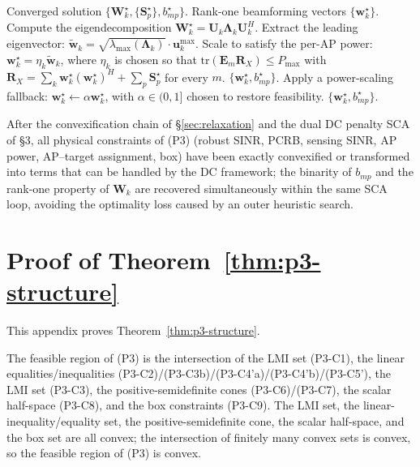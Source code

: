 \documentclass[12pt,a4paper]{article}
\newcommand{\vect}[1]{\mathbf{#1}}
\newcommand{\mat}[1]{\mathbf{#1}}
\newcommand{\tr}{\text{tr}}
\begin{document}
\begin{algorithm}[htbp]
\caption{Rank-One Beamforming Extraction (Baseline Post-Processing)}
\label{alg:rank1}
\begin{algorithmic}[1]
\Require Converged solution $\{\mat{W}_k^\star, \{\mat{S}_p^\star\}, b_{mp}^\star\}$.
\Ensure Rank-one beamforming vectors $\{\vect{w}_k^\star\}$.
    \State Compute the eigendecomposition $\mat{W}_k^\star = \mat{U}_k \mat{\Lambda}_k \mat{U}_k^H$.
    \State Extract the leading eigenvector: $\tilde{\vect{w}}_k = \sqrt{\lambda_{\max}(\mat{\Lambda}_k)} \cdot \mat{u}_k^{\max}$.
    \State Scale to satisfy the per-AP power: $\vect{w}_k^\star = \eta_k \tilde{\vect{w}}_k$, where $\eta_k$ is chosen so that $\tr(\mat{E}_m \mat{R}_X) \leq P_{\max}$ with $\mat{R}_X = \sum_k \vect{w}_k^\star (\vect{w}_k^\star)^H + \sum_p \mat{S}_p^\star$ for every $m$.
\EndFor
\If{$\{\vect{w}_k^\star, b_{mp}^\star\}$ satisfies all of (P1-C1)--(P1-C7')}
    \State \Return $\{\vect{w}_k^\star, b_{mp}^\star\}$.
\Else
    \State Apply a power-scaling fallback: $\vect{w}_k^\star \leftarrow \alpha \vect{w}_k^\star$, with $\alpha \in (0, 1]$ chosen to restore feasibility.
    \State \Return $\{\vect{w}_k^\star, b_{mp}^\star\}$.
\EndIf
\end{algorithmic}
\end{algorithm}

After the convexification chain of \S\ref{sec:relaxation} and the dual DC penalty SCA of \S3, all physical constraints of (P3) (robust SINR, PCRB, sensing SINR, AP power, AP--target assignment, box) have been exactly convexified or transformed into terms that can be handled by the DC framework; the binarity of $b_{mp}$ and the rank-one property of $\mat{W}_k$ are recovered simultaneously within the same SCA loop, avoiding the optimality loss caused by an outer heuristic search.

\appendix
\section{Proof of Theorem~\ref{thm:p3-structure}}\label{app:proof-p3}

This appendix proves Theorem~\ref{thm:p3-structure}.

The feasible region of (P3) is the intersection of the LMI set (P3-C1), the linear equalities/inequalities (P3-C2)/(P3-C3b)/(P3-C4'a)/(P3-C4'b)/(P3-C5'), the LMI set (P3-C3), the positive-semidefinite cones (P3-C6)/(P3-C7), the scalar half-space (P3-C8), and the box constraints (P3-C9). The LMI set, the linear-inequality/equality set, the positive-semidefinite cone, the scalar half-space, and the box set are all convex; the intersection of finitely many convex sets is convex, so the feasible region of (P3) is convex.
\end{document}
